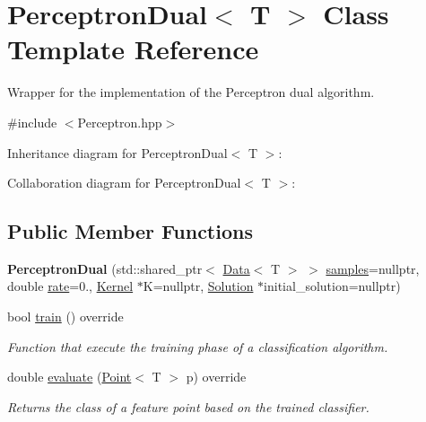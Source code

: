 \hypertarget{class_perceptron_dual}{}\section{Perceptron\+Dual$<$ T $>$ Class Template Reference}
\label{class_perceptron_dual}


Wrapper for the implementation of the Perceptron dual algorithm.  




{\ttfamily \#include $<$Perceptron.\+hpp$>$}



Inheritance diagram for Perceptron\+Dual$<$ T $>$\+:


Collaboration diagram for Perceptron\+Dual$<$ T $>$\+:
\subsection*{Public Member Functions}
\begin{DoxyCompactItemize}
\item 
\mbox{\label{class_perceptron_dual_a09289b10cd42be37fe50a7733f2a83e4}} 
{\bfseries Perceptron\+Dual} (std\+::shared\+\_\+ptr$<$ \mbox{\hyperlink{class_data}{Data}}$<$ T $>$ $>$ \mbox{\hyperlink{class_classifier_a0000b47a2e0784ada4c52d7046c4adb8}{samples}}=nullptr, double \mbox{\hyperlink{class_classifier_a7b1c4ef87631bd9e46682e5bc4315111}{rate}}=0., \mbox{\hyperlink{class_kernel}{Kernel}} $\ast$K=nullptr, \mbox{\hyperlink{class_solution}{Solution}} $\ast$initial\+\_\+solution=nullptr)
\item 
bool \mbox{\hyperlink{class_perceptron_dual_ac5e6aac8184fdf8f9d39d8d183d49190}{train}} () override
\begin{DoxyCompactList}\small\item\em Function that execute the training phase of a classification algorithm. \end{DoxyCompactList}\item 
double \mbox{\hyperlink{class_perceptron_dual_afae65908732e5f011be1d384387c71fe}{evaluate}} (\mbox{\hyperlink{class_point}{Point}}$<$ T $>$ p) override
\begin{DoxyCompactList}\small\item\em Returns the class of a feature point based on the trained classifier. \end{DoxyCompactList}\end{DoxyCompactItemize}
